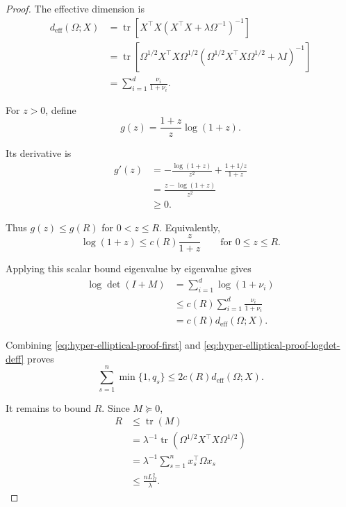 \documentclass{article} %
\begin{document}
\begin{proof}
The effective dimension is
\begin{align}
\label{eq:hyper-elliptical-proof-deff-eig}
d_{\mathrm{eff}}(\Omega;X)
&=
\operatorname{tr}
\!\left[
X^\top X
\left(
X^\top X+\lambda\Omega^{-1}
\right)^{-1}
\right]
\\
&=
\operatorname{tr}
\!\left[
\Omega^{1/2}X^\top X\Omega^{1/2}
\left(
\Omega^{1/2}X^\top X\Omega^{1/2}
+
\lambda I
\right)^{-1}
\right]
\\
&=
\sum_{i=1}^{d}
\frac{\nu_i}{1+\nu_i}.
\end{align}

For \(z>0\), define
\begin{equation}
\label{eq:hyper-elliptical-proof-g}
g(z)=
\frac{1+z}{z}\log(1+z).
\end{equation}

Its derivative is
\begin{align}
\label{eq:hyper-elliptical-proof-gprime}
g'(z)
&=
-\frac{\log(1+z)}{z^2}+\frac{1+1/z}{1+z}
\\
&=
\frac{z-\log(1+z)}{z^2}
\\
&\ge
0 .
\end{align}

Thus \(g(z)\le g(R)\) for \(0<z\le R\).  Equivalently,
\begin{equation}
\label{eq:hyper-elliptical-proof-scalar}
\log(1+z)
\le
c(R)\frac{z}{1+z}
\qquad
\text{for }0\le z\le R .
\end{equation}

Applying this scalar bound eigenvalue by eigenvalue gives
\begin{align}
\label{eq:hyper-elliptical-proof-logdet-deff}
\log\det(I+M)
&=
\sum_{i=1}^{d}\log(1+\nu_i)
\\
&\le
c(R)\sum_{i=1}^{d}\frac{\nu_i}{1+\nu_i}
\\
&=
c(R)d_{\mathrm{eff}}(\Omega;X).
\end{align}

Combining \eqref{eq:hyper-elliptical-proof-first} and \eqref{eq:hyper-elliptical-proof-logdet-deff} proves
\begin{equation}
\label{eq:hyper-elliptical-proof-main}
\sum_{s=1}^{n}\min\{1,q_s\}
\le
2c(R)d_{\mathrm{eff}}(\Omega;X).
\end{equation}

It remains to bound \(R\).  Since \(M\succeq 0\),
\begin{align}
\label{eq:hyper-elliptical-proof-R}
R
&\le
\operatorname{tr}(M)
\\
&=
\lambda^{-1}
\operatorname{tr}\!\left(\Omega^{1/2}X^\top X\Omega^{1/2}\right)
\\
&=
\lambda^{-1}
\sum_{s=1}^{n}
x_s^\top\Omega x_s
\\
&\le
\frac{nL_{\Omega}^2}{\lambda}.
\end{align}


\end{proof}
\end{document}
